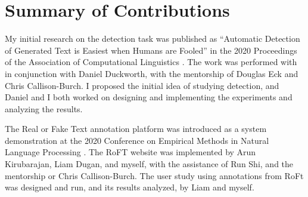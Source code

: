 \section{Summary of Contributions}
My initial research on the detection task was published as ``Automatic Detection of Generated Text is Easiest when Humans are Fooled'' in the 2020 Proceedings of the Association of Computational Linguistics \citep{ippolito2020automatic}.
The work was performed with in conjunction with Daniel Duckworth, with the mentorship of Douglas Eck and Chris Callison-Burch.
I proposed the initial idea of studying detection, and Daniel and I both worked on designing and implementing the experiments and analyzing the results.

The Real or Fake Text annotation platform was introduced as a system demonstration at the 2020 Conference on Empirical Methods in Natural Language Processing \citep{dugan2020roft}.
The RoFT website was implemented by Arun Kirubarajan, Liam Dugan, and myself, with the assistance of Run Shi, and the mentorship or Chris Callison-Burch.
The user study using annotations from RoFt was designed and run, and its results analyzed, by Liam and myself.
